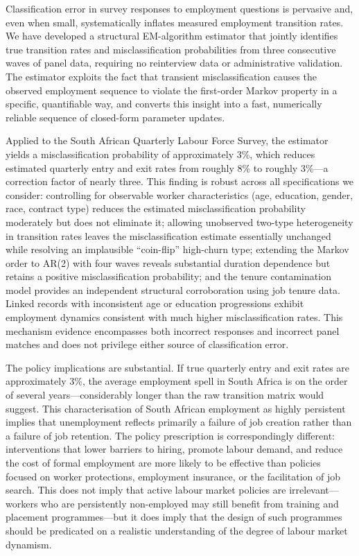 
Classification error in survey responses to employment questions is pervasive
and, even when small, systematically inflates measured employment transition
rates. We have developed a structural EM-algorithm estimator that jointly
identifies true transition rates and misclassification probabilities from
three consecutive waves of panel data, requiring no reinterview data or
administrative validation. The estimator exploits the fact that transient
misclassification causes the observed employment sequence to violate the
first-order Markov property in a specific, quantifiable way, and converts
this insight into a fast, numerically reliable sequence of closed-form
parameter updates.

Applied to the South African Quarterly Labour Force Survey, the estimator
yields a misclassification probability of approximately 3\%, which reduces
estimated quarterly entry and exit rates from roughly 8\% to roughly 3\%---a
correction factor of nearly three. This finding is robust across all
specifications we consider: controlling for observable worker characteristics
(age, education, gender, race, contract type) reduces the estimated
misclassification probability moderately but does not eliminate it; allowing
unobserved two-type heterogeneity in transition rates leaves the misclassification
estimate essentially unchanged while resolving an implausible ``coin-flip''
high-churn type; extending the Markov order to AR(2) with four waves reveals
substantial duration dependence but retains a positive misclassification
probability; and the tenure contamination model provides an independent
structural corroboration using job tenure data. Linked records with inconsistent
age or education progressions exhibit employment dynamics consistent with much
higher misclassification rates. This mechanism evidence encompasses both
incorrect responses and incorrect panel matches and does not privilege either
source of classification error.

The policy implications are substantial. If true quarterly entry and exit rates
are approximately 3\%, the average employment spell in South Africa is on the
order of several years---considerably longer than the raw transition matrix
would suggest. This characterisation of South African employment as highly
persistent implies that unemployment reflects primarily a failure of job creation
rather than a failure of job retention. The policy prescription is correspondingly
different: interventions that lower barriers to hiring, promote labour demand,
and reduce the cost of formal employment are more likely to be effective than
policies focused on worker protections, employment insurance, or the facilitation
of job search. This does not imply that active labour market policies are
irrelevant---workers who are persistently non-employed may still benefit from
training and placement programmes---but it does imply that the design of such
programmes should be predicated on a realistic understanding of the degree of
labour market dynamism.

